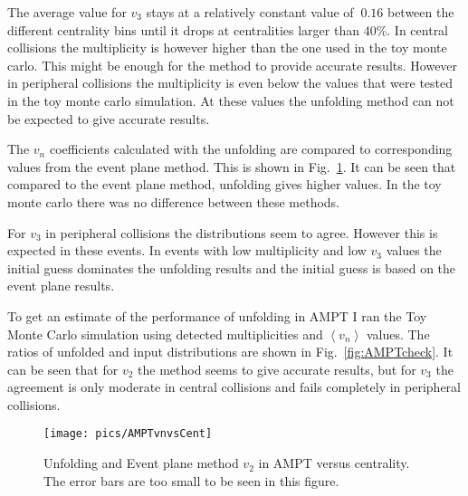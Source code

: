 The average value for $v_3$ stays at a relatively constant value of $~0.16$ between the different centrality bins until it drops at centralities larger than 40\%. In central collisions the multiplicity is however higher than the one used in the toy monte carlo. This might be enough for the method to provide accurate results. However in peripheral collisions the multiplicity is even below the values that were tested in the toy monte carlo simulation. At these values the unfolding method can not be expected to give accurate results.

The $v_n$ coefficients calculated with the unfolding are compared to corresponding values from the event plane method. This is shown in Fig.~\ref{fig:AMPTvnvsCent}. It can be seen that compared to the event plane method, unfolding gives higher values. In the toy monte carlo there was no difference between these methods.

For $v_3$ in peripheral collisions the distributions seem to agree. However this is expected in these events. In events with low multiplicity and low $v_3$ values the initial guess dominates the unfolding results and the initial guess is based on the event plane results. 

To get an estimate of the performance of unfolding in AMPT I ran the Toy Monte Carlo simulation using detected multiplicities and $ \left<v_n\right>$ values. The ratios of unfolded and input distributions are shown in Fig.~\ref{fig:AMPTcheck}. It can be seen that for $v_2$ the method seems to give accurate results, but for $v_3$ the agreement is only moderate in central collisions and fails completely in peripheral collisions.




\begin{figure}[htp]
	\centering
	\texttt{[image: pics/AMPTvnvsCent]}
	\caption{Unfolding and Event plane method $v_2$ in AMPT versus centrality. The error bars are too small to be seen in this figure.}
	\label{fig:AMPTvnvsCent}
	\end{figure}

%
%
%           




